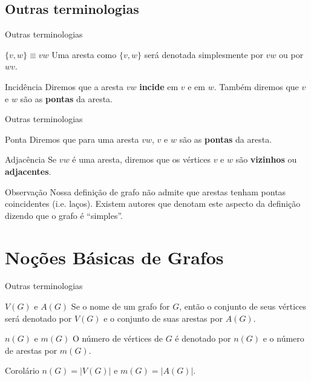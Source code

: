 \documentclass[xcolor=dvipsnames,table]{beamer}
\begin{document}
	\subsection{Outras terminologias}
	\begin{frame}{Outras terminologias}
		\begin{block}{$\{v,w\} \equiv vw$}
			Uma aresta como $\{v,w\}$ será denotada simplesmente por $vw$ ou por $wv$.
		\end{block}
		
		\begin{block}{Incidência}
			Diremos que a aresta $vw$ {\bf incide} em $v$ e em $w$. Também diremos que $v$ e $w$ são as {\bf pontas} da aresta.
		\end{block}
	\end{frame}
	
	\begin{frame}{Outras terminologias}
		\begin{block}{Ponta}
			Diremos que para uma aresta $vw$, $v$ e $w$ são as {\bf pontas} da aresta.
		\end{block}
		
		\begin{block}{Adjacência}
			Se $vw$ é uma aresta, diremos que os vértices $v$ e $w$ são {\bf vizinhos} ou {\bf adjacentes}.
		\end{block}
		
		\begin{block}{Observação}
			Nossa definição de grafo não admite que arestas tenham pontas coincidentes (i.e. laços). Existem autores que denotam este aspecto da definição dizendo que o grafo é ``simples''.
		\end{block}
	\end{frame}
	
	\section{Noções Básicas de Grafos}
	\begin{frame}{Outras terminologias}
		\begin{block}{$V(G)$ e $A(G)$}
			Se o nome de um grafo for $G$, então o conjunto de seus vértices será denotado por $V(G)$ e o conjunto de suas arestas por $A(G)$.
		\end{block}
		\pause
		\begin{block}{$n(G)$ e $m(G)$}
			O número de vértices de $G$ é denotado por $n(G)$ e o número de arestas por $m(G)$. 
		\end{block}
		\pause
		\begin{block}{Corolário}
			$n(G) = |V(G)|$ e $m(G) = |A(G)|$.
		\end{block}
	\end{frame}
	
\end{document}
